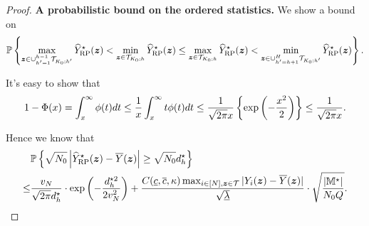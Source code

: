\documentclass[12pt]{article}
\begin{document}
\begin{proof}
   \textbf{A probabilistic bound on the ordered statistics.} We show a bound on
\begin{align*}
    {\mathbb{P}}\left\{\max_{{\boldsymbol{z}} \in \cup_{h' = 1}^{h-1} {\mathcal{T}}_{K_0;h'}}{\widehat{Y}}^\star_{\operatorname{RP}}({\boldsymbol{z}}) <\min_{{\boldsymbol{z}}\in{\mathcal{T}}_{K_0;h}}{\widehat{Y}}^\star_{\operatorname{RP}}({\boldsymbol{z}}) \le \max_{{\boldsymbol{z}}\in{\mathcal{T}}_{K_0;h}}{\widehat{Y}}^\star_{\operatorname{RP}}({\boldsymbol{z}})< \min_{{\boldsymbol{z}} \in \cup_{h' = h+1 }^H{\mathcal{T}}_{K_0;h'}} {\widehat{Y}}^\star_{\operatorname{RP}}({\boldsymbol{z}})\right\}.
\end{align*}



It's easy to show that 
\begin{align*}
    1-\Phi(x) = \int_x^\infty \phi(t) dt \le \frac{1}{x}\int_x^\infty t\phi(t) dt \le \frac{1}{\sqrt{2\pi}x}\left\{\exp\left(-\frac{x^2}{2}\right)\right\} \le \frac{1}{\sqrt{2\pi}x}.
\end{align*}

Hence we know that
\begin{align}\label{eqn:dev-bound-2}
       &{\mathbb{P}}\left\{\sqrt{N_0}\left|{\widehat{Y}}^\star_{\operatorname{RP}}({\boldsymbol{z}}) - \overline{Y}({\boldsymbol{z}})\right|\ge {\sqrt{N_0}d_h^\star} \right\}\\
   \le    &\frac{v_N}{\sqrt{2\pi }d_h^\star}\cdot \exp\left(-\frac{ d_h^{\star 2}}{2v_N^2}\right) + \frac{C(\underline{c}, \overline{c}, \kappa) \max_{i\in[N],{\boldsymbol{z}}\in{\mathcal{T}}}|Y_i({\boldsymbol{z}}) - \overline{Y}({\boldsymbol{z}})| }{\sqrt{\underline{\lambda}}}\cdot \sqrt{\frac{|{\mathbb{M}}^\star|}{N_0Q}}.
\end{align}


\end{proof}
\end{document}
